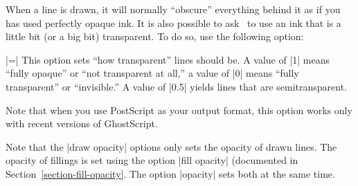 When a line is drawn, it will normally ``obscure'' everything behind
it as if you has used perfectly opaque ink. It is also possible to ask
\tikzname\ to use an ink that is a little bit (or a big bit)
transparent. To do so, use the following option:

\begin{itemize}
  |=|
  This option sets ``how transparent'' lines should be. A value of |1|
  means ``fully opaque'' or ``not transparent at all,'' a value of |0|
  means ``fully transparent'' or ``invisible.'' A value of |0.5|
  yields lines that are semitransparent.

  Note that when you use PostScript as your output format,
  this option works only with recent versions of GhostScript.
   
\begin{codeexample}[]
\end{codeexample}
\end{itemize}

Note that the |draw opacity| options only sets the opacity of drawn
lines. The opacity of fillings is set using the option
|fill opacity| (documented in Section~\ref{section-fill-opacity}. The
option |opacity| sets both at the same time. 

